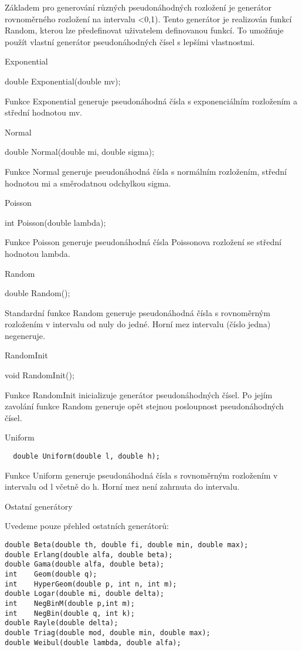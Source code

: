 \documentclass[a4paper]{article}
\begin{document}
Základem pro generování různých pseudonáhodných rozložení je generátor
rovnoměrného rozložení na intervalu <0,1). Tento generátor je realizován
funkcí Random, kterou lze předefinovat uživatelem definovanou
funkcí. To umožňuje použít vlastní generátor pseudonáhodných čísel
s lepšími vlastnostmi.


Exponential

  double Exponential(double mv);


Funkce Exponential generuje pseudonáhodná čísla s exponenciálním
rozložením a střední hodnotou mv.


Normal

  double Normal(double mi, double sigma);


Funkce Normal generuje pseudonáhodná čísla s normálním rozložením,
střední hodnotou mi a směrodatnou odchylkou sigma.


Poisson

  int Poisson(double lambda);


Funkce Poisson generuje pseudonáhodná čísla Poissonova rozložení
se střední hodnotou lambda.


Random

  double Random();


Standardní funkce Random generuje pseudonáhodná čísla s
rovnoměrným rozložením v intervalu od nuly do jedné. Horní mez intervalu
(číslo jedna) negeneruje.




RandomInit


  void RandomInit();


Funkce RandomInit inicializuje generátor pseudonáhodných
čísel. Po jejím zavolání funkce Random generuje opět stejnou
posloupnost pseudonáhodných čísel.

Uniform

\begin{verbatim}
  double Uniform(double l, double h);
\end{verbatim}


Funkce Uniform generuje pseudonáhodná čísla s rovnoměrným
rozložením v intervalu od l včetně do h. Horní
mez není zahrnuta do intervalu.

Ostatní generátory

Uvedeme pouze přehled ostatních generátorů:

\begin{verbatim}
double Beta(double th, double fi, double min, double max);
double Erlang(double alfa, double beta);
double Gama(double alfa, double beta);
int    Geom(double q);
int    HyperGeom(double p, int n, int m);
double Logar(double mi, double delta);
int    NegBinM(double p,int m);
int    NegBin(double q, int k);
double Rayle(double delta);
double Triag(double mod, double min, double max);
double Weibul(double lambda, double alfa);
\end{verbatim}
\end{document}
